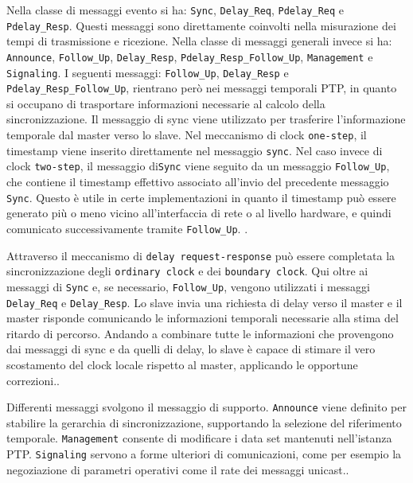 \begin{sloppypar}

  Nella classe di messaggi evento si ha: \texttt{Sync}, \texttt{Delay\_Req}, \texttt{Pdelay\_Req}
  e \texttt{Pdelay\_Resp}. 
  Questi messaggi sono direttamente coinvolti nella misurazione dei tempi di trasmissione e ricezione.
  Nella classe di messaggi generali invece si ha: \texttt{Announce}, \texttt{Follow\_Up},
  \texttt{Delay\_Resp}, \texttt{Pdelay\_Resp\_Follow\_Up}, \texttt{Management} e \texttt{Signaling}.
  I seguenti messaggi: \texttt{Follow\_Up}, \texttt{Delay\_Resp} e \texttt{Pdelay\_Resp\_Follow\_Up}, rientrano però 
  nei messaggi temporali PTP, in quanto si occupano di trasportare informazioni necessarie al calcolo della sincronizzazione.
  Il messaggio di sync viene utilizzato per trasferire l'informazione temporale dal master verso lo slave.
  Nel meccanismo di clock \texttt{one-step}, il timestamp viene inserito direttamente nel messaggio \texttt{sync}.
  Nel caso invece di clock \texttt{two-step}, il messaggio  di\texttt{Sync} viene seguito da
  un messaggio \texttt{Follow\_Up}, che contiene il timestamp effettivo associato
  all'invio del precedente messaggio \texttt{Sync}.
  Questo è utile in certe implementazioni in quanto il timestamp può essere generato più o meno vicino all'interfaccia di rete o al livello hardware,
  e quindi comunicato successivamente tramite \texttt{Follow\_Up}.
  \cite{IEEEStandardPrecision2020}.
\end{sloppypar}

Attraverso il meccanismo di \texttt{delay request-response} può essere completata la 
sincronizzazione degli \texttt{ordinary clock} e dei \texttt{boundary clock}. 
Qui oltre ai messaggi di \texttt{Sync} e, se necessario, \texttt{Follow\_Up},
vengono utilizzati i messaggi \texttt{Delay\_Req} e \texttt{Delay\_Resp}. Lo slave
invia una richiesta di delay verso il master e il master risponde comunicando le informazioni
temporali necessarie alla stima del ritardo di percorso. 
Andando a combinare tutte le informazioni che provengono dai messaggi di sync e da quelli di 
delay, lo slave è capace di stimare il vero scostamento del clock locale rispetto al master, 
applicando le opportune correzioni.\cite{IEEEStandardPrecision2020}.

Differenti messaggi svolgono il messaggio di supporto. 
\texttt{Announce} viene definito per stabilire la gerarchia di sincronizzazione, supportando
 la selezione del riferimento temporale. \texttt{Management} consente di modificare i data set mantenuti nell'istanza PTP.
 \texttt{Signaling} servono a forme ulteriori di comunicazioni, come per 
 esempio la negoziazione di parametri operativi come il rate dei messaggi unicast.\cite{IEEEStandardPrecision2020}.

